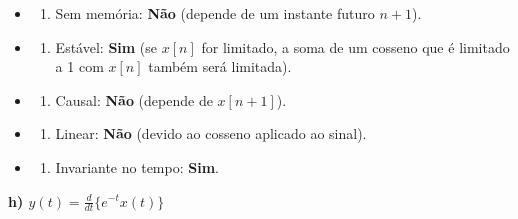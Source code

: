 \begin{itemize}
\tightlist
\item
  \begin{enumerate}
  \def\labelenumi{(\roman{enumi})}
  \tightlist
  \item
    Sem memória: \textbf{Não} (depende de um instante futuro \(n+1\)).
  \end{enumerate}
\item
  \begin{enumerate}
  \def\labelenumi{(\roman{enumi})}
  \setcounter{enumi}{1}
  \tightlist
  \item
    Estável: \textbf{Sim} (se \(x[n]\) for limitado, a soma de um cosseno que é limitado a 1 com \(x[n]\) também será limitada).
  \end{enumerate}
\item
  \begin{enumerate}
  \def\labelenumi{(\roman{enumi})}
  \setcounter{enumi}{2}
  \tightlist
  \item
    Causal: \textbf{Não} (depende de \(x[n+1]\)).
  \end{enumerate}
\item
  \begin{enumerate}
  \def\labelenumi{(\roman{enumi})}
  \setcounter{enumi}{3}
  \tightlist
  \item
    Linear: \textbf{Não} (devido ao cosseno aplicado ao sinal).
  \end{enumerate}
\item
  \begin{enumerate}
  \def\labelenumi{(\alph{enumi})}
  \setcounter{enumi}{21}
  \tightlist
  \item
    Invariante no tempo: \textbf{Sim}.
  \end{enumerate}
\end{itemize}

\textbf{h) \(y(t) = \frac{d}{dt}\{e^{-t}x(t)\}\)}


